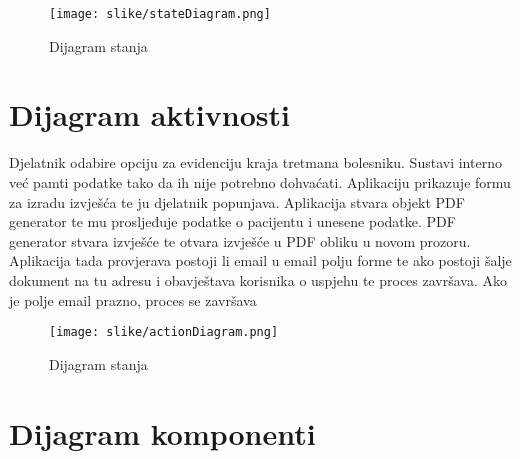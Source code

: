 			\begin{figure}[H]
				\texttt{[image: slike/stateDiagram.png]} %
				\centering
				\caption{Dijagram stanja}
				\label{fig:stateDiagram}
			\end{figure}
			
			
			\eject 
		
		\section{Dijagram aktivnosti}
			
			
			
			Djelatnik odabire opciju za evidenciju kraja tretmana bolesniku. Sustavi interno već pamti podatke tako da ih nije potrebno dohvaćati. Aplikaciju prikazuje formu za izradu izvješća te ju djelatnik popunjava. Aplikacija stvara objekt PDF generator te mu prosljeđuje podatke o pacijentu i unesene podatke. PDF generator stvara izvješće te otvara izvješće u PDF obliku u novom prozoru. Aplikacija tada provjerava postoji li email u email polju forme te ako postoji šalje dokument na tu adresu i obavještava korisnika o uspjehu te proces završava. Ako je polje email prazno, proces se završava
			
			\begin{figure}[H]
				\texttt{[image: slike/actionDiagram.png]} %
				\centering
				\caption{Dijagram stanja}
				\label{fig:actionDiagram}
			\end{figure}
			
			\eject
		\section{Dijagram komponenti}
		
		
